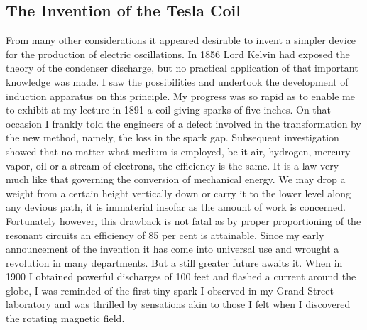 \documentclass[a4paper,12pt,english,twoside,openright]{memoir}
\begin{document}
\subsection{The Invention of the Tesla Coil}
From many other considerations it appeared desirable to invent a simpler device for the 
production of electric oscillations.  In 1856 Lord Kelvin had exposed the theory of the condenser 
discharge, but no practical application of that important knowledge was made.  I saw the 
possibilities and undertook the development of induction apparatus on this principle.  My progress 
was so rapid as to enable me to exhibit at my lecture in 1891 a coil giving sparks of five inches.  
On that occasion I frankly told the engineers of a defect involved in the transformation by the new 
method, namely, the loss in the spark gap.  Subsequent investigation showed that no matter what 
medium is employed, be it air, hydrogen, mercury vapor, oil or a stream of electrons, the 
efficiency is the same.  It is a law very much like that governing the conversion of mechanical 
energy.  We may drop a weight from a certain height vertically down or carry it to the lower level 
along any devious path, it is immaterial insofar as the amount of work is concerned.  Fortunately 
however, this drawback is not fatal as by proper proportioning of the resonant circuits an 
efficiency of 85 per cent is attainable.  Since my early announcement of the invention it has come 
into universal use and wrought a revolution in many departments.  But a still greater future awaits 
it.  When in 1900 I obtained powerful discharges of 100 feet and flashed a current around the 
globe, I was reminded of the first tiny spark I observed in my Grand Street laboratory and was 
thrilled by sensations akin to those I felt when I discovered the rotating magnetic field.  



	{\centering
		\aldine\\
		\aldine\hspace{1.2em}\aldine
		\par}
	\vspace*{2cm}
	
\end{document}
